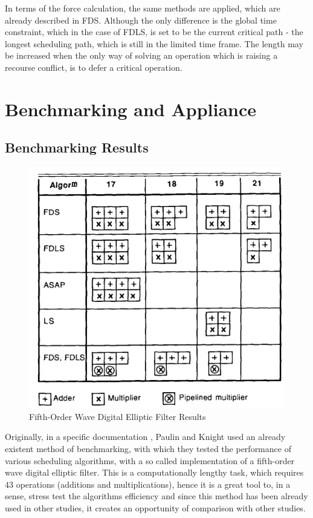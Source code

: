 \documentclass[conference]{IEEEtran}
\begin{document}
In terms of the force calculation, the same methods are applied, which are already described in FDS. Although the only difference is the global time constraint, which in the case of FDLS, is set to be the current critical path - the longest scheduling path, which is still in the limited time frame. The length may be increased when the only way of solving an operation which is raising a recourse conflict, is to defer a critical operation.

\section{Benchmarking and Appliance}

\subsection{Benchmarking Results}

\begin{figure}[htbp]
\centerline{\includegraphics[scale=.5]{Result_Applience.png}}
\caption{Fifth-Order Wave Digital Elliptic Filter Results}
\label{wavefilter}
\end{figure}

Originally, in a specific documentation \cite{b2}, Paulin and Knight used an already existent method of benchmarking, with which they tested the performance of various scheduling algorithms, with a so called implementation of a fifth-order wave digital elliptic filter. This is a computationally lengthy task, which requires 43 operations (additions and multiplications), hence it is a great tool to, in a sense, stress test the algorithms efficiency and since this method has been already used in other studies, it creates an opportunity of comparison with other studies.
\end{document}
